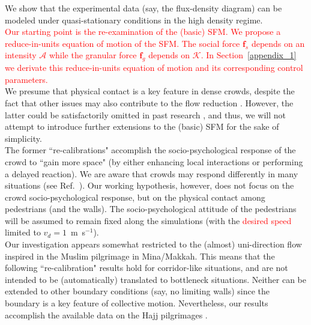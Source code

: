 \documentclass[preprint,12pt]{elsarticle}
\begin{document}
We show that the experimental data (say, the flux-density diagram) can be 
modeled under quasi-stationary conditions in the high density regime.\\

\textcolor{red}{Our starting point is the re-examination of the (basic) SFM. 
We propose a reduce-in-units equation of motion of the SFM. The social 
force $\mathbf{f}_s$ depends on an intensity $\mathcal{A}$ while the granular force $\mathbf{f}_g$ depends
on $\mathcal{K}$. In Section~\ref{appendix_1} we derivate this reduce-in-units equation of motion
and its corresponding control parameters. }\\


 We presume that physical contact is
a key feature in dense crowds, despite the fact that other issues may
also contribute to the flow reduction \cite{johansson1}. However, the latter could
be satisfactorily omitted in past research \cite{johansson}, and thus, we will not
attempt to introduce further extensions to the (basic) SFM for the
sake of simplicity.\\

The former ``re-calibrations" accomplish the socio-psychological
response of the crowd to ``gain more space" (by either enhancing local
interactions or performing a delayed reaction). We are aware that
crowds may respond differently in many situations (see Ref.~\cite{drury1}). Our working
hypothesis, however, does not focus on the crowd socio-psychological
response, but on the physical contact among pedestrians (and the
walls). The socio-psychological attitude of the pedestrians will be
assumed to remain fixed along the simulations (with the 
\textcolor{red}{desired speed} limited to $v_d=1\,$ m~s$^{-1}$). \\


Our investigation appears somewhat restricted to the (almost)
uni-direction flow inspired in the Muslim pilgrimage in Mina/Makkah.
This means that the following ``re-calibration" results hold for
corridor-like situations, and are not intended to be (automatically)
translated to bottleneck situations. Neither can be extended to other
boundary conditions (say, no limiting walls) since the boundary is a
key feature of collective motion. Nevertheless, our results accomplish
the available data on the Hajj pilgrimages \cite{helbing3,lohner1}.
\end{document}
